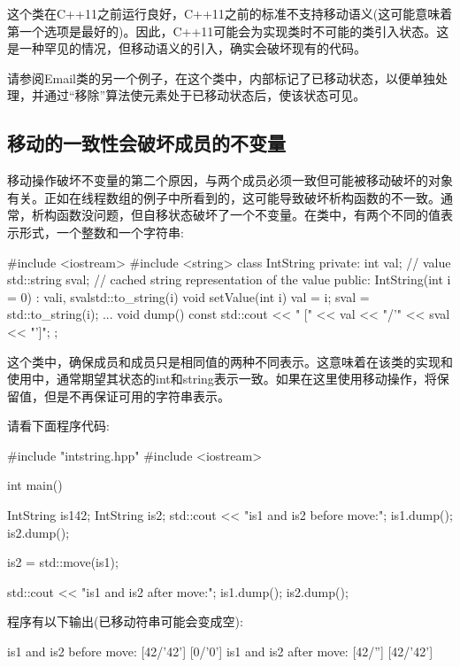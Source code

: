 这个类在C++11之前运行良好，C++11之前的标准不支持移动语义(这可能意味着第一个选项是最好的)。因此，C++11可能会为实现类时不可能的类引入状态。这是一种罕见的情况，但移动语义的引入，确实会破坏现有的代码。

请参阅Email类的另一个例子，在这个类中，内部标记了已移动状态，以便单独处理，并通过“移除”算法使元素处于已移动状态后，使该状态可见。

\subsection{移动的一致性会破坏成员的不变量}

移动操作破坏不变量的第二个原因，与两个成员必须一致但可能被移动破坏的对象有关。正如在线程数组的例子中所看到的，这可能导致破坏析构函数的不一致。通常，析构函数没问题，但自移状态破坏了一个不变量。在类中，有两个不同的值表示形式，一个整数和一个字符串:

\begin{cppcode}
#include <iostream>
#include <string>
class IntString
{
	private:
	int val; // value
	std::string sval; // cached string representation of the value
	public:
	IntString(int i = 0)
	: val{i}, sval{std::to_string(i)} {
	}
	void setValue(int i) {
		val = i;
		sval = std::to_string(i);
	}
	...
	void dump() const {
		std::cout << " [" << val << "/'" << sval << "']\n";
	}
};
\end{cppcode}

这个类中，确保成员和成员只是相同值的两种不同表示。这意味着在该类的实现和使用中，通常期望其状态的int和string表示一致。如果在这里使用移动操作，将保留值，但是不再保证可用的字符串表示。

请看下面程序代码:

\begin{cppcode}
#include "intstring.hpp"
#include <iostream>

int main()
{
	IntString is1{42};
	IntString is2;
	std::cout << "is1 and is2 before move:\n";
	is1.dump();
	is2.dump();

	is2 = std::move(is1);

	std::cout << "is1 and is2 after move:\n";
	is1.dump();
	is2.dump();
}
\end{cppcode}

程序有以下输出(已移动符串可能会变成空):

\begin{outputcode}
is1 and is2 before move:
 [42/'42']
 [0/'0']
is1 and is2 after move:
 [42/'']
 [42/'42']
\end{outputcode}

